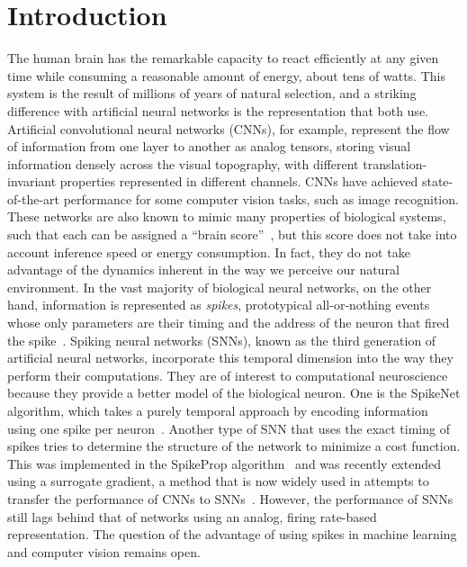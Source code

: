 \documentclass[default]{sn-jnl}%
\theoremstyle{thmstyleone}%
\theoremstyle{thmstyletwo}%
\theoremstyle{thmstylethree}%
\begin{document}
\section{Introduction}
\label{sec:intro}
%
The human brain has the remarkable capacity to react efficiently at any given time while consuming a reasonable amount of energy, about tens of watts. This system is the result of millions of years of natural selection, and a striking difference with artificial neural networks is the representation that both use. Artificial convolutional neural networks (CNNs), for example, represent the flow of information from one layer to another as analog tensors, storing visual information densely across the visual topography, with different translation-invariant properties represented in different channels. CNNs have achieved state-of-the-art performance for some computer vision tasks, such as image recognition. These networks are also known to mimic many properties of biological systems, such that each can be assigned a ``brain score''~\citep{schrimpf_brain-score_2020}, but this score does not take into account inference speed or energy consumption. In fact, they do not take advantage of the dynamics inherent in the way we perceive our natural environment. In the vast majority of biological neural networks, on the other hand, information is represented as \emph{spikes}, prototypical all-or-nothing events whose only parameters are their timing and the address of the neuron that fired the spike~\citep{paugam-moisy_computing_2012}. Spiking neural networks (SNNs), known as the third generation of artificial neural networks, incorporate this temporal dimension into the way they perform their computations. They are of interest to computational neuroscience because they provide a better model of the biological neuron. One is the SpikeNet algorithm, which takes a purely temporal approach by encoding information using one spike per neuron~\citep{delorme_spikenet_1999}. Another type of SNN that uses the exact timing of spikes tries to determine the structure of the network to minimize a cost function. This was implemented in the SpikeProp algorithm~\citep{bohte_error-backpropagation_2002} and was recently extended using a surrogate gradient, a method that is now widely used in attempts to transfer the performance of CNNs to SNNs~\citep{zenke_remarkable_2021}. However, the performance of SNNs still lags behind that of networks using an analog, firing rate-based representation. The question of the advantage of using spikes in machine learning and computer vision remains open.
\end{document}
